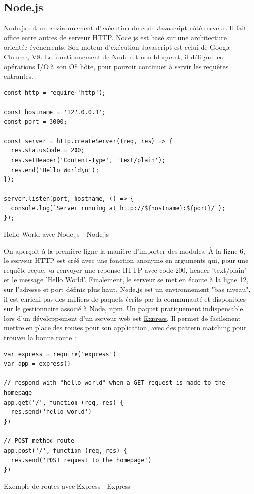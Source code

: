 \documentclass[a4paper, 12pt]{article}
\newenvironment{code}{\captionsetup{type=listing}}{}
\begin{document}
\subsection{Node.js}
Node.js est un environnement d'exécution de code Javascript côté serveur. Il fait office entre autres de serveur HTTP.
Node.js est basé sur une architecture orientée événements. Son moteur d'exécution Javascript est celui de Google Chrome, V8.
Le fonctionnement de Node est non bloquant, il délègue les opérations I/O à son OS hôte, pour pouvoir continuer à servir
les requêtes entrantes.
\begin{code}
    \begin{verbatim}
const http = require('http');

const hostname = '127.0.0.1';
const port = 3000;

const server = http.createServer((req, res) => {
  res.statusCode = 200;
  res.setHeader('Content-Type', 'text/plain');
  res.end('Hello World\n');
});

server.listen(port, hostname, () => {
  console.log(`Server running at http://${hostname}:${port}/`);
});
    \end{verbatim}
    \caption{Hello World avec Node.js - Node.js \cite{ref170}}
\end{code}
On aperçoit à la première ligne la manière d'importer des modules. À la ligne 6, le serveur HTTP est créé avec
une fonction anonyme en arguments qui, pour une requête reçue, va renvoyer une réponse HTTP avec code 200, header
'text/plain' et le message 'Hello World'. Finalement, le serveur se met en écoute à la ligne 12, sur l'adresse et
port définis plus haut. Node.js est un environnement "bas niveau", il est enrichi pas des milliers de paquets écrits
par la communauté et disponibles sur le gestionnaire associé à Node, \href{https://www.npmjs.com/}{npm}. Un paquet
pratiquement indispensable lors d'un développement d'un serveur web est \href{http://expressjs.com/}{Express}. Il
permet de facilement mettre en place des routes pour son application, avec des pattern matching pour trouver la bonne
route :
\begin{code}
    \begin{verbatim}
var express = require('express')
var app = express()

// respond with "hello world" when a GET request is made to the homepage
app.get('/', function (req, res) {
  res.send('hello world')
})

// POST method route
app.post('/', function (req, res) {
  res.send('POST request to the homepage')
})
    \end{verbatim}
    \caption{Exemple de routes avec Express - Express \cite{ref180}}
\end{code}
\end{document}

